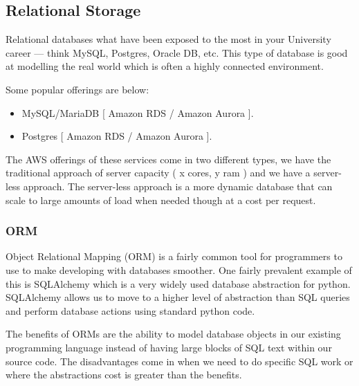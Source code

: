 \documentclass{csse4400}
\begin{document}

\subsection{Relational Storage}

Relational databases what have been exposed to the most in your University career --- think MySQL, Postgres, Oracle DB, etc.
This type of database is good at modelling the real world which is often a highly connected environment.

Some popular offerings are below:

\begin{itemize}
  \item MySQL/MariaDB [ Amazon RDS / Amazon Aurora ].
  \item Postgres [ Amazon RDS / Amazon Aurora ].
\end{itemize}

The AWS offerings of these services come in two different types, we have the traditional approach of
server capacity ( x cores, y ram ) and we have a server-less approach.
The server-less approach is a more dynamic
database that can scale to large amounts of load when needed though at a cost per request.

  \subsubsection{ORM}
  Object Relational Mapping (ORM) is a fairly common tool for programmers to use to make developing with databases smoother.
  One fairly prevalent example of this is SQLAlchemy which is a very widely used 
  database abstraction for python.
  SQLAlchemy allows us to move to a higher level of abstraction than SQL queries and perform database actions using standard python code.

  The benefits of ORMs are the ability to model database objects in our existing programming language instead of having large blocks of SQL text within our source code.
  The disadvantages come in when we need to do specific SQL work or where the abstractions cost is greater than the benefits.
\end{document}
